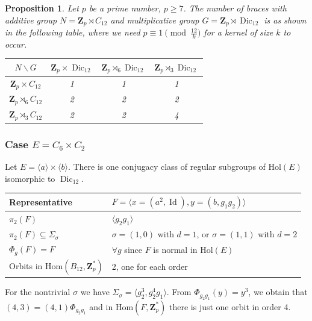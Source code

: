 \documentclass[12pt]{article}
\newtheorem{proposition}[theorem]{Proposition}
\theoremstyle{definition}
\newcommand{\Z}{\mathbf Z}
\newcommand{\Hol}{\mathrm{Hol}}
\newcommand{\Hom}{\mathrm{Hom}}
\newcommand{\Id}{\operatorname{Id}}
\newcommand{\Dic}{\operatorname{Dic}}
\begin{document}
\begin{proposition}
	Let $p$ be a prime number, $p\geq 7$. The number of braces with additive group $N=\Z_p \rtimes C_{12}$ and multiplicative group $G=\Z_p\rtimes \Dic_{12}$ is as shown in the following table, where we need
	$p\equiv 1 \pmod{\frac {12}k}$ for a kernel of size $k$ to occur.
	
	\begin{center}
		\begin{tabular}{|c||c|c|c|}
			\hline
			$N \backslash G$ & $\Z_p\times \Dic_{12}$ & $\Z_p\rtimes_{6} \Dic_{12}$ & $\Z_p\rtimes_{3} \Dic_{12}$  \\
			\hline
			\hline
			$\Z_p \times C_{12}$ &1&1&1\\
			\hline
			$\Z_p \rtimes_{6} C_{12}$ &2&2&2\\
			\hline
			$\Z_p \rtimes_{3} C_{12}$ &2&2&4\\
			\hline
			
		\end{tabular}
	\end{center}
\end{proposition}



\subsubsection*{Case $E=C_{6}\times C_2$}

Let $E=\langle a\rangle \times \langle b \rangle$. There is 
one conjugacy class of regular subgroups of $\Hol(E)$ isomorphic to $\Dic_{12}$.


\begin{center}
    \begin{tabular}{|l|l|}
    \hline
      Representative& $F=\langle x=(a^2,\Id), y=(b,g_1 g_2)\rangle $ \\
      \hline
       $\pi_2(F)$& $\langle g_2 g_1\rangle$ \\
      $\pi_2(F)\subseteq \Sigma_{\sigma}$ &  $\sigma=(1,0)$ with $d=1$, or $\sigma=(1,1)$ with $d=2$\\
      $\Phi_g(F)=F$ & $\forall g$ since $F$ is normal in $\Hol(E)$\\
      Orbits in $\Hom(B_{12},\Z_p^*)$ &  2, one for each order\\
      \hline
    \end{tabular}
\end{center}    

For the nontrivial $\sigma$ we have $\Sigma_{\sigma}=\langle g_2^3, g_2^4g_1\rangle$. From
$\Phi_{g_2 g_1}(y)=y^3$, we obtain that
$(4,3)=(4,1)\Phi_{g_2 g_1}$ and in $\Hom(F,\Z_p^*)$ there is just one orbit in order 4.
\end{document}
